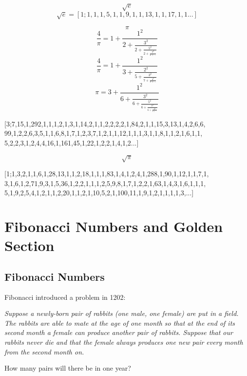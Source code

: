 \documentclass{jreport}
\begin{document}
\[\sqrt{e}\]
\[\sqrt{e}=[1;1,1,1,5,1,1,9,1,1,13,1,1,17,1,1...]\]

\[\pi\]
\[\frac{4}{\pi}=1+\frac{1^2}{2+\frac{3^2}{2+\frac{5^2}{2+\frac{7^2}{2+...}}}}\]
\[\frac{4}{\pi}=1+\frac{1^2}{3+\frac{2^2}{5+\frac{3^2}{7+\frac{4^2}{9+...}}}}\]
\[\pi=3+\frac{1^2}{6+\frac{3^2}{6+\frac{5^2}{6+\frac{7^2}{6+\frac{9^2}{6+...}}}}}\]
\begin{center}
\begin{minipage}{10cm}
[3;7,15,1,292,1,1,1,2,1,3,1,14,2,1,1,2,2,2,2,1,84,2,1,1,15,3,13,1,4,2,6,6,
99,1,2,2,6,3,5,1,1,6,8,1,7,1,2,3,7,1,2,1,1,12,1,1,1,3,1,1,8,1,1,2,1,6,1,1,
5,2,2,3,1,2,4,4,16,1,161,45,1,22,1,2,2,1,4,1,2...]
\end{minipage}
\end{center}

\[\sqrt{\pi}\]
\begin{center}
\begin{minipage}{10cm}
[1;1,3,2,1,1,6,1,28,13,1,1,2,18,1,1,1,83,1,4,1,2,4,1,288,1,90,1,12,1,1,7,1,
3,1,6,1,2,71,9,3,1,5,36,1,2,2,1,1,1,2,5,9,8,1,7,1,2,2,1,63,1,4,3,1,6,1,1,1,
5,1,9,2,5,4,1,2,1,1,2,20,1,1,2,1,10,5,2,1,100,11,1,9,1,2,1,1,1,1,3,...]
\end{minipage}
\end{center}

\pagebreak

\chapter*{Fibonacci Numbers and Golden Section}

\section*{Fibonacci Numbers}
\begin{center}
\begin{minipage}{10cm}
Fibonacci introduced a problem in 1202:

\itshape
Suppose a newly-born pair of rabbits (one male, one female) are put in a field. The rabbits are able to mate at the age of one month so that at the end of its second month a female can produce another pair of rabbits. Suppose that our rabbits never die and that the female always produces one new pair every month from the second month on.
\begin{center}
How many pairs will there be in one year?
\end{center}
\end{minipage}
\end{center}
\end{document}
